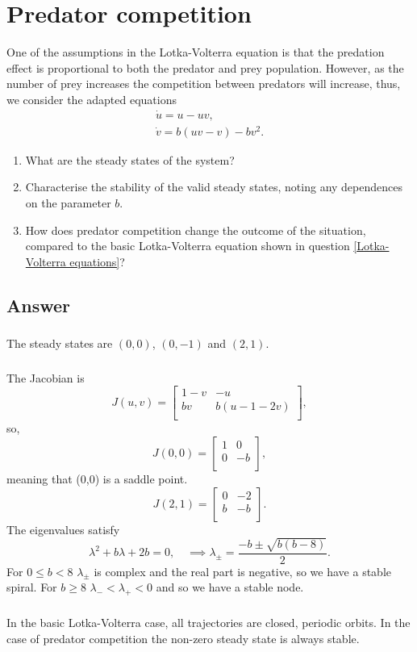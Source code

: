 \documentclass[]{article}
\newcommand{\bb}{\begin{equation}}
\newcommand{\ee}{\end{equation}}
\begin{document}
\section{Predator competition}
One of the assumptions in the Lotka-Volterra equation is that the predation effect is proportional to both the predator and prey population. However, as the number of prey increases the  competition between predators will increase, thus, we consider the adapted equations
\begin{align}
\dot{u}=u-uv,\\
\dot{v}=b(uv-v)-bv^2.
\end{align}
\begin{enumerate}
\item What are the steady states of the system?
\item Characterise the stability of the valid steady states, noting any dependences on the parameter $b$.
\item How does predator competition change the outcome of the situation, compared to the basic Lotka-Volterra equation shown in question \ref{Lotka-Volterra equations}?
\end{enumerate}
\begin{Answ}
\subsection{Answer}
\subsubsection{}
The steady states are $(0,0)$, $(0,-1)$ and $(2,1)$.
\subsubsection{}
The Jacobian is
\bb
J(u,v)=\left[ {\begin{array}{cc}
   1-v & -u \\
   bv & b(u-1-2v) \\
  \end{array} } \right],
\ee
so,
\bb
J(0,0)=\left[ {\begin{array}{cc}
   1 & 0 \\
   0 & -b \\
  \end{array} } \right],
\ee
meaning that (0,0) is a saddle point.
\bb
J(2,1)=\left[ {\begin{array}{cc}
   0 & -2 \\
   b & -b \\
  \end{array} } \right].
\ee
The eigenvalues satisfy
\bb
\lambda^2+b\lambda+2b=0,\quad\implies\lambda_\pm=\frac{-b\pm\sqrt{b(b-8)}}{2}.
\ee
For $0\leq b < 8$ $\lambda_\pm$ is complex and the real part is negative, so we have a stable spiral. For $b\geq 8$ $\lambda_-<\lambda_+<0$ and so we have a stable node.
\subsubsection{}
In the basic Lotka-Volterra case, all trajectories are closed, periodic orbits. In the case of predator competition the non-zero steady state is always stable.
\end{Answ}
\end{document}
